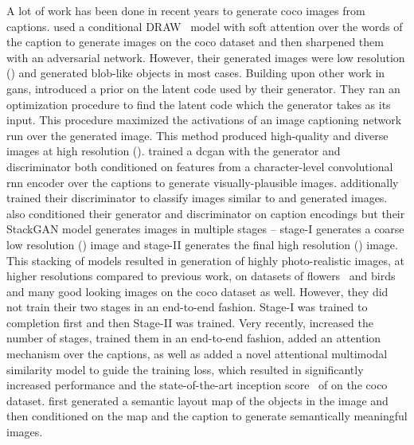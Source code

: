 \documentclass{article}
\begin{document}
A lot of work has been done in recent years to generate \gls{coco} images from captions. \citet{ICLR2016_elman} used a conditional DRAW~\cite{draw} model with soft attention over the words of the caption to generate images on the \gls{coco} dataset and then sharpened them with an adversarial network. However, their generated images were low resolution () and generated blob-like objects in most cases. Building upon other work in \glspl{gan}, \citet{ppgn} introduced a prior on the latent code used by their generator. 
They ran an optimization procedure to find the latent code which the generator takes as its input. This procedure maximized the activations of an image captioning network run over the generated image. This method produced high-quality and diverse images at high resolution (). \citet{ICML2016_reed} trained a \gls{dcgan} with the generator and discriminator both conditioned on features from a character-level convolutional \gls{rnn} encoder over the captions to generate visually-plausible  images. \citet{tac-gan} additionally trained their discriminator to classify images similar to \citet{acgan} and generated  images. \citet{Zhang_2017_ICCV} also conditioned their generator and discriminator on caption encodings but their StackGAN model generates images in multiple stages -- stage-I generates a coarse low resolution () image and stage-II generates the final high resolution () image. This stacking of models resulted in generation of highly photo-realistic images, at higher resolutions compared to previous work, on datasets of flowers~\cite{flowers} and birds~\cite{WahCUB_200_2011_birds} and many good looking images on the \gls{coco} dataset as well. However, they did not train their two stages in an end-to-end fashion. Stage-I was trained to completion first and then Stage-II was trained. Very recently, \citet{attngan} increased the number of stages, trained them in an end-to-end fashion, added an attention mechanism over the captions, as well as added a novel attentional multimodal similarity model to guide the training loss, which resulted in significantly increased performance and the state-of-the-art inception score~\cite{NIPS2016_6125_inception} of  on the \gls{coco} dataset. \citet{honglak2018} first generated a semantic layout map of the objects in the image and then conditioned on the map and the caption to generate semantically meaningful  images.
\end{document}
